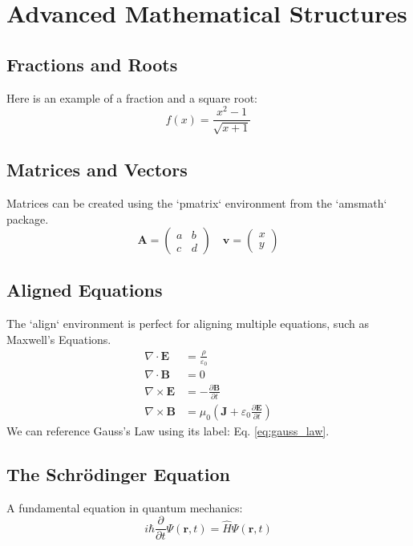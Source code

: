 \documentclass{article}
\begin{document}
\section{Advanced Mathematical Structures}

\subsection{Fractions and Roots}
Here is an example of a fraction and a square root:
\[
f(x) = \frac{x^2 - 1}{\sqrt{x+1}}
\]

\subsection{Matrices and Vectors}
Matrices can be created using the `pmatrix` environment from the `amsmath` package.
\[
\mathbf{A} = \begin{pmatrix}
a & b \\
c & d
\end{pmatrix}
\quad
\mathbf{v} = \begin{pmatrix}
x \\
y
\end{pmatrix}
\]

\subsection{Aligned Equations}
The `align` environment is perfect for aligning multiple equations, such as Maxwell's Equations.
\begin{align}
\nabla \cdot \mathbf{E} &= \frac{\rho}{\varepsilon_0} \label{eq:gauss_law} \\
\nabla \cdot \mathbf{B} &= 0 \\
\nabla \times \mathbf{E} &= -\frac{\partial \mathbf{B}}{\partial t} \\
\nabla \times \mathbf{B} &= \mu_0 \left( \mathbf{J} + \varepsilon_0 \frac{\partial \mathbf{E}}{\partial t} \right)
\end{align}
We can reference Gauss's Law using its label: Eq. \ref{eq:gauss_law}.

\subsection{The Schrödinger Equation}
A fundamental equation in quantum mechanics:
\begin{equation}
i\hbar\frac{\partial}{\partial t}\Psi(\mathbf{r},t) = \hat{H}\Psi(\mathbf{r},t)
\end{equation}
\end{document}
